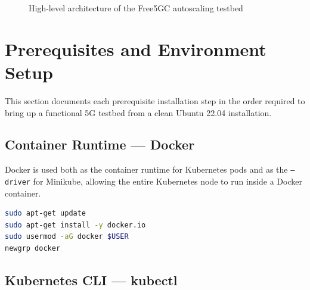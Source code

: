\begin{figure}[H]
  \centering
  \caption{High-level architecture of the Free5GC autoscaling testbed}
  \label{fig:arch_overview}
\end{figure}

\section{Prerequisites and Environment Setup}
\label{sec:prerequisites}

This section documents each prerequisite installation step in the order required to bring up a functional 5G testbed from a clean Ubuntu 22.04 installation.

\subsection{Container Runtime — Docker}

Docker is used both as the container runtime for Kubernetes pods and as the \texttt{--driver} for Minikube, allowing the entire Kubernetes node to run inside a Docker container.

\begin{lstlisting}[language=bash, caption={Installing Docker and adding the user to the docker group}, label={lst:docker_install}]
sudo apt-get update
sudo apt-get install -y docker.io
sudo usermod -aG docker $USER
newgrp docker
\end{lstlisting}

\subsection{Kubernetes CLI — kubectl}

